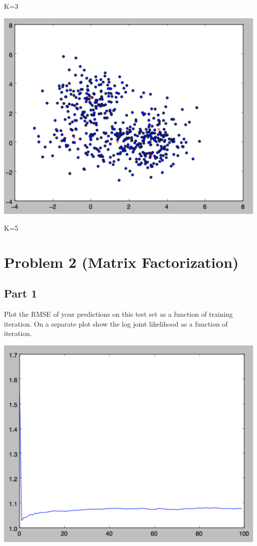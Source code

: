 \documentclass[11pt]{article}
\begin{document}
K=3

\includegraphics[scale=.5]{images/k5}

K=5

\section*{Problem 2 (Matrix Factorization)}

\subsection*{Part 1}

Plot the RMSE of your predictions on this test set as a function of training iteration. On a separate plot show the log joint likelihood as a function of iteration.

\includegraphics[scale=.5]{images/rmse}
\end{document}
